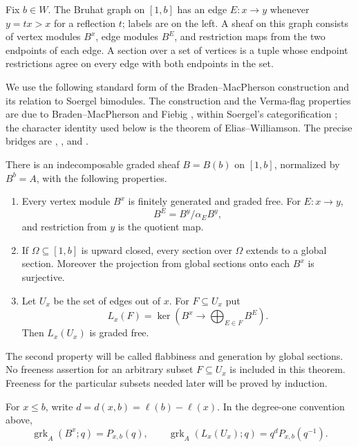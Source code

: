 Fix $b\in W$.  The Bruhat graph on $[1,b]$ has an edge
$E:x\longrightarrow y$ whenever $y=tx>x$ for a reflection $t$; labels are
on the left.  A sheaf on this graph consists of vertex modules $B^x$, edge
modules $B^E$, and restriction maps from the two endpoints of each edge.
A section over a set of vertices is a tuple whose endpoint restrictions
agree on every edge with both endpoints in the set.

We use the following standard form of the Braden--MacPherson construction
and its relation to Soergel bimodules.  The construction and the Verma-flag
properties are due to Braden--MacPherson and Fiebig
\cite{BM01,FiebigVerma08,Fiebig08}, within Soergel's categorification
\cite{Soergel07}; the character identity
used below is the theorem of Elias--Williamson.  The precise bridges are
\cite[Theorem~6.3, Corollary~6.5, and Proposition~7.1]{Fiebig08},
\cite[Section~3]{FiebigSurvey}, and \cite[Theorem~1.1]{EW14}.

\begin{theorem}
\label{bg:bmp}
There is an indecomposable graded sheaf $B=B(b)$ on $[1,b]$, normalized by
$B^b=A$, with the following properties.
\begin{enumerate}
\item Every vertex module $B^x$ is finitely generated and graded free.
For $E:x\longrightarrow y$,
\[
 B^E=B^y/\alpha_E B^y,
\]
and restriction from $y$ is the quotient map.
\item If $\Omega\subseteq[1,b]$ is upward closed, every section over
$\Omega$ extends to a global section.  Moreover the projection from global
sections onto each $B^x$ is surjective.
\item Let $U_x$ be the set of edges out of $x$.  For $F\subseteq U_x$ put
\[
 L_x(F)=\ker\left(B^x\longrightarrow
                   \bigoplus_{E\in F}B^E\right).
\]
Then $L_x(U_x)$ is graded free.
\end{enumerate}
\end{theorem}

The second property will be called flabbiness and generation by global
sections.  No freeness assertion for an arbitrary subset $F\subseteq U_x$
is included in this theorem.  Freeness for the particular subsets needed
later will be proved by induction.

\begin{proposition}
\label{bg:normalization}
For $x\le b$, write $d=d(x,b)=\ell(b)-\ell(x)$.  In the degree-one
convention above,
\begin{equation}
\label{eq:bg-ranks}
 \operatorname{grk}_A(B^x;q)=P_{x,b}(q),
 \qquad
 \operatorname{grk}_A(L_x(U_x);q)=q^dP_{x,b}(q^{-1}).
\end{equation}
\end{proposition}


